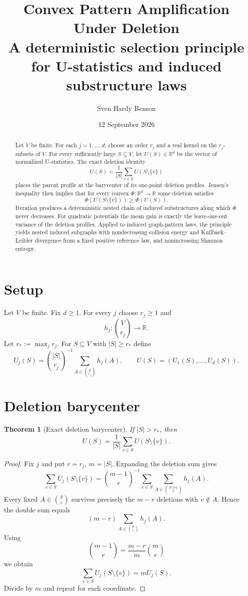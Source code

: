 \documentclass[11pt]{article}
\title{Convex Pattern Amplification Under Deletion\\\large A deterministic selection principle for U-statistics and induced substructure laws}
\author{Sven Hardy Benson}
\date{12 September 2026}
\newtheorem{theorem}{Theorem}
\newcommand{\R}{\mathbb R}
\begin{document}
\maketitle

\begin{abstract}
Let $V$ be finite. For each $j=1,\dots,d$, choose an order $r_j$ and a real kernel on the $r_j$-subsets of $V$. For every sufficiently large $S\subseteq V$, let $U(S)\in\R^d$ be the vector of normalized U-statistics. The exact deletion identity
\[
U(S)=\frac1{|S|}\sum_{v\in S}U(S\setminus\{v\})
\]
places the parent profile at the barycenter of its one-point deletion profiles. Jensen's inequality then implies that for every convex $\Phi:\R^d\to\R$ some deletion satisfies
\[
\Phi(U(S\setminus\{v\}))\ge \Phi(U(S)).
\]
Iteration produces a deterministic nested chain of induced substructures along which $\Phi$ never decreases. For quadratic potentials the mean gain is exactly the leave-one-out variance of the deletion profiles. Applied to induced graph-pattern laws, the principle yields nested induced subgraphs with nondecreasing collision energy and Kullback--Leibler divergence from a fixed positive reference law, and nonincreasing Shannon entropy.
\end{abstract}

\section{Setup}
Let $V$ be finite. Fix $d\ge1$. For every $j$ choose $r_j\ge1$ and
\[
h_j:\binom{V}{r_j}\to\R.
\]
Let $r_*:=\max_j r_j$. For $S\subseteq V$ with $|S|\ge r_*$ define
\[
U_j(S)=\binom{|S|}{r_j}^{-1}\sum_{A\in\binom{S}{r_j}}h_j(A),
\qquad
U(S)=(U_1(S),\dots,U_d(S)).
\]

\section{Deletion barycenter}
\begin{theorem}[Exact deletion barycenter]
If $|S|>r_*$, then
\[
U(S)=\frac1{|S|}\sum_{v\in S}U(S\setminus\{v\}).
\]
\end{theorem}

\begin{proof}
Fix $j$ and put $r=r_j$, $m=|S|$. Expanding the deletion sum gives
\[
\sum_{v\in S}U_j(S\setminus\{v\})
=\binom{m-1}{r}^{-1}
\sum_{v\in S}\sum_{A\in\binom{S\setminus\{v\}}r}h_j(A).
\]
Every fixed $A\in\binom Sr$ survives precisely the $m-r$ deletions with $v\notin A$. Hence the double sum equals
\[
(m-r)\sum_{A\in\binom Sr}h_j(A).
\]
Using
\[
\binom{m-1}{r}=\frac{m-r}{m}\binom mr
\]
we obtain
\[
\sum_{v\in S}U_j(S\setminus\{v\})=mU_j(S).
\]
Divide by $m$ and repeat for each coordinate.
\end{proof}
\end{document}
